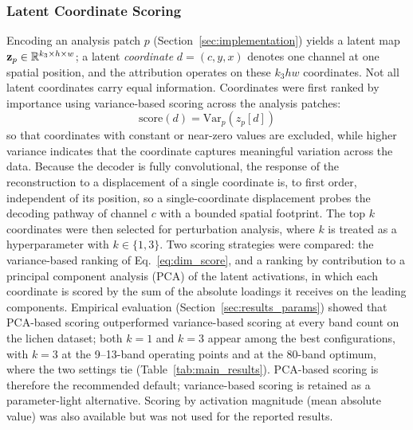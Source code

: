 \subsubsection{Latent Coordinate Scoring}
Encoding an analysis patch $p$ (Section~\ref{sec:implementation}) yields a latent map $\mathbf{z}_p \in \mathbb{R}^{k_3 \times h \times w}$; a latent \emph{coordinate} $d = (c, y, x)$ denotes one channel at one spatial position, and the attribution operates on these $k_3 h w$ coordinates.
Not all latent coordinates carry equal information.
Coordinates were first ranked by importance using variance-based scoring across the analysis patches:
\begin{equation}
\text{score}(d) = \text{Var}_{p}\left(z_p[d]\right)
\label{eq:dim_score}
\end{equation}
so that coordinates with constant or near-zero values are excluded, while higher variance indicates that the coordinate captures meaningful variation across the data.
Because the decoder is fully convolutional, the response of the reconstruction to a displacement of a single coordinate is, to first order, independent of its position, so a single-coordinate displacement probes the decoding pathway of channel $c$ with a bounded spatial footprint.
The top $k$ coordinates were then selected for perturbation analysis, where $k$ is treated as a hyperparameter with $k \in \{1, 3\}$.
Two scoring strategies were compared: the variance-based ranking of Eq.~\eqref{eq:dim_score}, and a ranking by contribution to a principal component analysis (PCA) of the latent activations, in which each coordinate is scored by the sum of the absolute loadings it receives on the leading components.
Empirical evaluation (Section~\ref{sec:results_params}) showed that PCA-based scoring outperformed variance-based scoring at every band count on the lichen dataset; both $k = 1$ and $k = 3$ appear among the best configurations, with $k = 3$ at the 9--13-band operating points and at the 80-band optimum, where the two settings tie (Table~\ref{tab:main_results}).
PCA-based scoring is therefore the recommended default; variance-based scoring is retained as a parameter-light alternative.
Scoring by activation magnitude (mean absolute value) was also available but was not used for the reported results.

